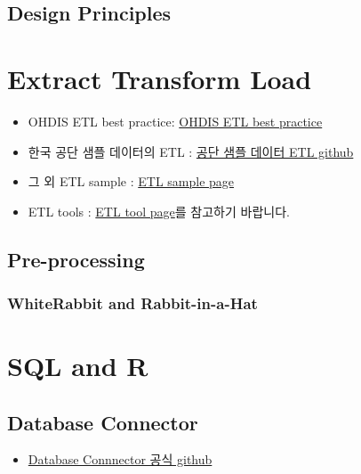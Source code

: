 \documentclass[]{book}
\providecommand{\tightlist}{%
  \setlength{\itemsep}{0pt}\setlength{\parskip}{0pt}}
\begin{document}
\hypertarget{design-principles}{%
\section{Design Principles}\label{design-principles}}

\hypertarget{etl}{%
\chapter{Extract Transform Load}\label{etl}}

\begin{itemize}
\tightlist
\item
  OHDIS ETL best practice: \href{https://www.ohdsi.org/web/wiki/doku.php?id=documentation:etl_best_practices}{OHDIS ETL best practice}
\item
  한국 공단 샘플 데이터의 ETL : \href{https://github.com/OHDSI/ETL---Korean-NSC}{공단 샘플 데이터 ETL github}
\item
  그 외 ETL sample : \href{https://www.ohdsi.org/web/wiki/doku.php?id=documentation:example_etls}{ETL sample page}
\item
  ETL tools : \href{https://www.ohdsi.org/web/wiki/doku.php?id=documentation:software:whiterabbit}{ETL tool page}를 참고하기 바랍니다.
\end{itemize}

\hypertarget{pre-processing}{%
\section{Pre-processing}\label{pre-processing}}

\hypertarget{whiterabbit-and-rabbit-in-a-hat}{%
\subsection{WhiteRabbit and Rabbit-in-a-Hat}\label{whiterabbit-and-rabbit-in-a-hat}}

\hypertarget{sql-and-r}{%
\chapter{SQL and R}\label{sql-and-r}}

\hypertarget{database-connector}{%
\section{Database Connector}\label{database-connector}}

\begin{itemize}
\tightlist
\item
  \href{https://github.com/ohdsi/databaseconnector}{Database Connnector 공식 github}
\end{itemize}
\end{document}
